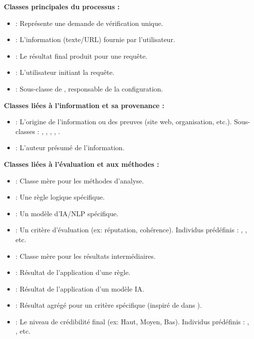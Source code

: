 \documentclass[9pt,twocolumn,twoside,french]{article}
\begin{document}
\textbf{Classes principales du processus :}
\begin{itemize}
    \item {}: Représente une demande de vérification unique.
    \item {}: L'information (texte/URL) fournie par l'utilisateur.
    \item {}: Le résultat final produit pour une requête.
    \item {}: L'utilisateur initiant la requête.
    \item {}: Sous-classe de , responsable de la configuration.
\end{itemize}

\textbf{Classes liées à l'information et sa provenance :}
\begin{itemize}
    \item {}: L'origine de l'information ou des preuves (site web, organisation, etc.). Sous-classes : , , , , .
    \item {}: L'auteur présumé de l'information.
\end{itemize}

\textbf{Classes liées à l'évaluation et aux méthodes :}
\begin{itemize}
    \item {}: Classe mère pour les méthodes d'analyse.
    \item {}: Une règle logique spécifique.
    \item {}: Un modèle d'IA/NLP spécifique.
    \item {}: Un critère d'évaluation (ex: réputation, cohérence). Individus prédéfinis : , , etc.
    \item {}: Classe mère pour les résultats intermédiaires.
    \item {}: Résultat de l'application d'une règle.
    \item {}: Résultat de l'application d'un modèle IA.
    \item {}: Résultat agrégé pour un critère spécifique (inspiré de  dans \parencite{Loyer2018Rapport}).
    \item {}: Le niveau de crédibilité final (ex: Haut, Moyen, Bas). Individus prédéfinis : , , etc.
\end{itemize}
\end{document}
